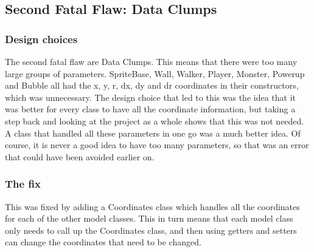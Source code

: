 \subsection{Second Fatal Flaw: Data Clumps}

\subsubsection{Design choices}

The second fatal flaw are Data Clumps. This means that there were too many large groups of parameters. SpriteBase, Wall, Walker, Player, Monster, Powerup and Bubble all had the x, y, r, dx, dy and dr coordinates in their constructors, which was unnecessary. The design choice that led to this was the idea that it was better for every class to have all the coordinate information, but taking a step back and looking at the project as a whole shows that this was not needed. A class that handled all these parameters in one go was a much better idea. Of course, it is never a good idea to have too many parameters, so that was an error that could have been avoided earlier on. 


\subsubsection{The fix}

This was fixed by adding a Coordinates class which handles all the coordinates for each of the other model classes. This in turn means that each model class only needs to call up the Coordinates class, and then using getters and setters can change the coordinates that need to be changed.